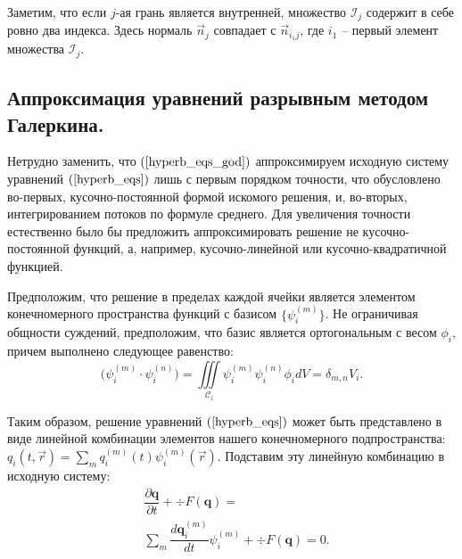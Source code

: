 \documentclass[14pt, a4paper, fleqn]{extreport}
\begin{document}
	Заметим, что если $j$-ая грань является внутренней, множество $\mathcal{I}_j$ содержит в себе ровно два индекса.
	Здесь нормаль $\vec{n}_j$ совпадает с $\vec{n}_{i_1 j}$, где $i_1$ -- первый элемент множества $\mathcal{I}_j$.
	
	\subsection{Аппроксимация уравнений разрывным методом Галеркина.}

	Нетрудно заменить, что $(\ref{hyperb_eqs_god})$ аппроксимируем исходную систему 
	уравнений $(\ref{hyperb_eqs})$ лишь с первым порядком точности,
	что обусловлено во-первых, кусочно-постоянной формой искомого решения, и, во-вторых, интегрированием потоков по формуле среднего.
	Для увеличения точности естественно было бы предложить аппроксимировать решение не кусочно-постоянной функций,
	а, например, кусочно-линейной или кусочно-квадратичной функцией.
	
	Предположим, что решение в пределах каждой ячейки является элементом
	конечномерного пространства функций с базисом ${\lbrace \psi_i^{(m)} \rbrace}$.
	Не ограничивая общности суждений, предположим, что базис является ортогональным с весом $\phi_i$, причем 
	выполнено следующее равенство:
	\begin{equation}
	\label{basis_cond}
		\Big(\psi_i^{(m)} \cdot \psi_i^{(n)} \Big)
			= \iiint\limits_{\mathcal{C}_i} \psi_i^{(m)} \psi_i^{(n)} \phi_i dV
			= \delta_{m,n} V_i.
	\end{equation}
	
	Таким образом, решение уравнений $(\ref{hyperb_eqs})$ может быть представлено в 
	виде линейной комбинации элементов нашего конечномерного 
	подпространства: $q_i(t, \vec{r}) = \sum\limits_m q_i^{(m)}(t)\psi_i^{(m)}(\vec{r})$.
	Подставим эту линейную комбинацию в исходную систему:
	\begin{equation*}
	\begin{split}
		&\dfrac{\partial \textbf{q}}{\partial t} + \div{F(\textbf{q})} = 
		\\
		&\sum\limits_m\dfrac{d \textbf{q}_i^{(m)}}{d t}\psi_i^{(m)} + \div{F(\textbf{q})} = 0.
	\end{split}
	\end{equation*}
	
\end{document}
